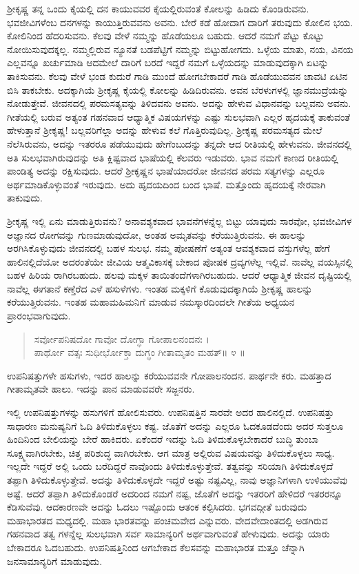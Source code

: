 ಶ್ರೀಕೃಷ್ಣ ತನ್ನ ಒಂದು ಕೈಯಲ್ಲಿ ದನ ಕಾಯುವವರ ಕೈಯಲ್ಲಿರುವಂತೆ ಕೋಲನ್ನು ಹಿಡಿದು ಕೊಂಡಿರುವನು. ಭವಜೀವಿಗಳೆಂಬ ದನಗಳನ್ನು ಕಾಯುತ್ತಿರುವವನು ಅವನು. ಬೇರೆ ಕಡೆ ಹೋದಾಗ ದಾರಿಗೆ ತರುವುದು ಕೋಲಿನ ಭಯ. ಕೋಲಿನಿಂದ ಹೆದರಿಸುವನು. ಕೆಲವು ವೇಳೆ ನಮ್ಮನ್ನು ಹೊಡೆಯಲೂ ಬಹುದು. ಆದರೆ ನಮಗೆ ಪೆಟ್ಟು ಕೊಟ್ಟು ನೋಯಿಸುವುದಕ್ಕಲ್ಲ. ನಮ್ಮಲ್ಲಿರುವ ನ್ಯೂನತೆ ಬಡಪೆಟ್ಟಿಗೆ ನಮ್ಮನ್ನು ಬಿಟ್ಟುಹೋಗದು. ಒಳ್ಳೆಯ ಮಾತು, ನಯ, ವಿನಯ ಎಲ್ಲವನ್ನೂ ಖರ್ಚುಮಾಡಿ ಆದಮೇಲೆ ದಾರಿಗೆ ಬರದೆ ಇದ್ದರೆ ನಮಗೆ ಒಳ್ಳೆಯದನ್ನು ಮಾಡುವುದಕ್ಕಾಗಿ ಏಟನ್ನು ತಾಕಿಸುವನು. ಕೆಲವು ವೇಳೆ ಭಂಡ ಕುದುರೆ ಗಾಡಿ ಮುಂದೆ ಹೋಗಬೇಕಾದರೆ ಗಾಡಿ ಹೊಡೆಯುವವನ ಚಾವಟಿ ಏಟಿನ ಬಿಸಿ ತಾಕಬೇಕು. ಅದಕ್ಕಾಗಿಯೆ ಶ್ರೀಕೃಷ್ಣ ಕೈಯಲ್ಲಿ ಕೋಲನ್ನು ಹಿಡಿದಿರುವನು. ಅವನ ಬೆರಳುಗಳಲ್ಲಿ ಜ್ಞಾನಮುದ್ರೆಯನ್ನು ನೋಡುತ್ತೇವೆ. ಜೀವನದಲ್ಲಿ ಪರಮಸತ್ಯವನ್ನು ತಿಳಿದವನು ಅವನು. ಅದನ್ನು ಹೇಳುವ ವಿಧಾನವನ್ನು ಬಲ್ಲವನು ಅವನು. ಗೀತೆಯಲ್ಲಿ ಬರುವ ಅತ್ಯಂತ ಗಹನವಾದ ಆಧ್ಯಾತ್ಮಿಕ ವಿಷಯಗಳನ್ನು ಎಷ್ಟು ಸುಲಭವಾಗಿ ಎಲ್ಲರ ಹೃದಯಕ್ಕೆ ತಾಕುವಂತೆ ಹೇಳುತ್ತಾನೆ ಶ್ರೀಕೃಷ್ಣ! ಬಲ್ಲವರಿಗೆಲ್ಲಾ ಅದನ್ನು ಹೇಳುವ ಕಲೆ ಗೊತ್ತಿರುವುದಿಲ್ಲ. ಶ್ರೀಕೃಷ್ಣ ಪರಮಸತ್ಯದ ಮೇಲೆ ನೆಲೆಸಿರುವನು, ಅದನ್ನು ಇತರರೂ ಪಡೆಯುವುದು ಹೇಗೆಂಬುದನ್ನು ತನ್ನದೇ ಆದ ರೀತಿಯಲ್ಲಿ ಹೇಳುವನು. ಜೀವನದಲ್ಲಿ ಅತಿ ಸುಲಭವಾಗಿರುವುದನ್ನು ಅತಿ ಕ್ಲಿಷ್ಟವಾದ ಭಾಷೆಯಲ್ಲಿ ಕೆಲವರು ಇಡುವರು. ಭಾವ ನಮಗೆ ಕಾಣದ ರೀತಿಯಲ್ಲಿ ಪಾಂಡಿತ್ಯ ಅದನ್ನು ರಕ್ಷಿಸುವುದು. ಆದರೆ ಶ್ರೀಕೃಷ್ಣನ ಭಾಷೆಯಾದರೋ ಜೀವನದ ಪರಮ ಸತ್ಯಗಳನ್ನು ಎಲ್ಲರೂ ಅರ್ಥಮಾಡಿಕೊಳ್ಳುವಂತೆ ಇರುವುದು. ಅದು ಹೃದಯದಿಂದ ಬಂದ ಭಾಷೆ. ಮತ್ತೊಂದು ಹೃದಯಕ್ಕೆ ನೇರವಾಗಿ ತಾಕುವುದು.

ಶ್ರೀಕೃಷ್ಣ ಇಲ್ಲಿ ಏನು ಮಾಡುತ್ತಿರುವನು? ಅನಾವಶ್ಯಕವಾದ ಭಾವನೆಗಳನ್ನೆಲ್ಲ ಬಿಟ್ಟು ಯಾವುದು ಸಾರವೋ, ಭವಜೀವಿಗಳ ಅಜ್ಞಾನದ ರೋಗವನ್ನು ಗುಣಮಾಡುವುದೋ, ಅಂತಹ ಅಮೃತವನ್ನು ಕರೆಯುತ್ತಿರುವನು. ಈ ಹಾಲನ್ನು ಅರಗಿಸಿಕೊಳ್ಳುವುದು ಜೀವನದಲ್ಲಿ ಬಹಳ ಸುಲಭ. ನಮ್ಮ ಪೋಷಣೆಗೆ ಅತ್ಯಂತ ಆವಶ್ಯಕವಾದ ವಸ್ತುಗಳೆಲ್ಲ ಹೇಗೆ ಹಾಲಿನಲ್ಲಿದೆಯೋ ಅದರಂತೆಯೇ ಜೀವಿಯ ಆತ್ಮವಿಕಾಸಕ್ಕೆ ಬೇಕಾದ ಪೋಷಕ ದ್ರವ್ಯಗಳೆಲ್ಲ ಇಲ್ಲಿವೆ. ನಾವೆಲ್ಲ ವಯಸ್ಸಿನಲ್ಲಿ ಬಹಳ ಹಿರಿಯ ರಾಗಿರಬಹುದು. ಹಲವು ಮಕ್ಕಳ ತಾಯಿತಂದೆಗಳಾಗಿರಬಹುದು. ಆದರೆ ಆಧ್ಯಾತ್ಮಿಕ ಜೀವನ ದೃಷ್ಟಿಯಲ್ಲಿ ನಾವೆಲ್ಲ ಈಗತಾನೆ ಕಣ್ತೆರೆದ ಎಳೆ ಹಸುಳೆಗಳು. ಇಂತಹ ಮಕ್ಕಳಿಗೆ ಕೊಡುವುದಕ್ಕಾಗಿಯೆ ಶ್ರೀಕೃಷ್ಣ ಹಾಲನ್ನು ಕರೆಯುತ್ತಿರುವನು. ಇಂತಹ ಮಹಾಮಹಿಮನಿಗೆ ಮಾಡುವ ನಮಸ್ಕಾರದಿಂದಲೇ ಗೀತೆಯ ಅಧ್ಯಯನ ಪ್ರಾರಂಭವಾಗುವುದು.

\begin{verse}
ಸರ್ವೋಪನಿಷದೋ ಗಾವೋ ದೋಗ್ಧಾ ಗೋಪಾಲನಂದನಃ ।\\ ಪಾರ್ಥೋ ವತ್ಸಃ ಸುಧೀರ್ಭೋಕ್ತಾ ದುಗ್ಧಂ ಗೀತಾಮೃತಂ ಮಹತ್\num{॥ ೪ ॥}
\end{verse}

{\small ಉಪನಿಷತ್ತುಗಳೇ ಹಸುಗಳು, ಇದರ ಹಾಲನ್ನು ಕರೆಯುವವನೇ ಗೋಪಾಲನಂದನ. ಪಾರ್ಥನೇ ಕರು. ಮಹತ್ತಾದ ಗೀತಾಮೃತವೇ ಹಾಲು. ಇದನ್ನು ಪಾನ ಮಾಡುವವರೇ ಸಜ್ಜನರು.}

ಇಲ್ಲಿ ಉಪನಿಷತ್ತುಗಳನ್ನು ಹಸುಗಳಿಗೆ ಹೋಲಿಸುವರು. ಉಪನಿಷತ್ತಿನ ಸಾರವೇ ಅದರ ಹಾಲಿನಲ್ಲಿದೆ. ಉಪನಿಷತ್ತು ಸಾಧಾರಣ ಮನುಷ್ಯನಿಗೆ ಓದಿ ತಿಳಿದುಕೊಳ್ಳಲು ಕಷ್ಟ. ಜೊತೆಗೆ ಅದನ್ನು ಎಲ್ಲರೂ ಓದಕೂಡದೆಂದು ಅದರ ಸುತ್ತಲೂ ಹಿಂದಿನಿಂದ ಬೇಲಿಯನ್ನು ಬೇರೆ ಹಾಕಿದರು. ಏಕೆಂದರೆ ಇದನ್ನು ಓದಿ ತಿಳಿದುಕೊಳ್ಳಬೇಕಾದರೆ ಬುದ್ಧಿ ತುಂಬಾ ಸೂಕ್ಷ್ಮವಾಗಿರಬೇಕು, ಚಿತ್ತ ಪರಿಶುದ್ಧ ವಾಗಿರಬೇಕು. ಆಗ ಮಾತ್ರ ಅಲ್ಲಿರುವ ವಿಷಯವನ್ನು ತಿಳಿದುಕೊಳ್ಳಲು ಸಾಧ್ಯ. ಇಲ್ಲದೇ ಇದ್ದರೆ ಅಲ್ಲಿ ಒಂದು ಬರೆದಿದ್ದರೆ ನಾವೊಂದು ತಿಳಿದುಕೊಳ್ಳುತ್ತೇವೆ. ತತ್ವವನ್ನು ಸರಿಯಾಗಿ ತಿಳಿದುಕೊಳ್ಳದೆ ತಪ್ಪಾಗಿ ತಿಳಿದುಕೊಳ್ಳುತ್ತೇವೆ. ಅದನ್ನು ತಿಳಿದುಕೊಳ್ಳದೇ ಇದ್ದರೆ ಅಷ್ಟು ನಷ್ಟವಿಲ್ಲ, ನಾವು ಅಜ್ಞಾನಿಗಳಾಗಿ ಉಳಿಯುವೆವು ಅಷ್ಟೆ. ಆದರೆ ತಪ್ಪಾಗಿ ತಿಳಿದುಕೊಂಡರೆ ಅದರಿಂದ ನಮಗೆ ನಷ್ಟ, ಜೊತೆಗೆ ಅದನ್ನು ಇತರರಿಗೆ ಹೇಳಿದರೆ ಇತರರನ್ನೂ ಕೆಡಿಸುವೆವು. ಆದಕಾರಣವೇ ಅದನ್ನು ಓದಲು ಇಷ್ಟೊಂದು ಆತಂಕ ಕಲ್ಪಿಸಿದರು. ಭಗವದ್ಗೀತೆ ಬರುವುದು ಮಹಾಭಾರತದ ಮಧ್ಯದಲ್ಲಿ. ಮಹಾ ಭಾರತವನ್ನು ಪಂಚಮವೇದ ಎನ್ನುವರು. ವೇದವೇದಾಂತದಲ್ಲಿ ಅಡಗಿರುವ ಗಹನವಾದ ತತ್ವ ಗಳನ್ನೆಲ್ಲ ಸುಲಭವಾಗಿ ಸರ್ವ ಸಾಮಾನ್ಯರಿಗೆ ಅರ್ಥವಾಗುವಂತೆ ಹೇಳುವುದು. ಅದನ್ನು ಯಾರು ಬೇಕಾದರೂ ಓದಬಹುದು. ಉಪನಿಷತ್ತಿನಿಂದ ಆಗಬೇಕಾದ ಕೆಲಸವನ್ನು ಮಹಾಭಾರತ ಮತ್ತೂ ಚೆನ್ನಾಗಿ ಜನಸಾಮಾನ್ಯರಿಗೆ ಮಾಡುವುದು.

